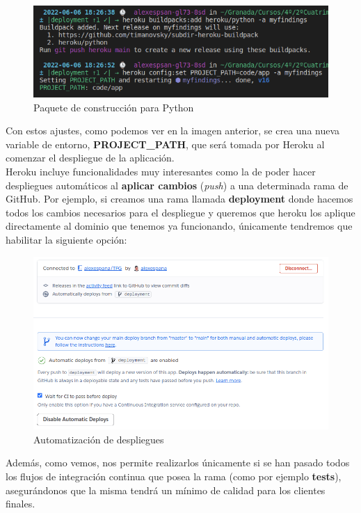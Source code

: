     \begin{figure}[H]
        \centering
        \includegraphics[scale=0.55]{imagenes/second-buildpack.png}
        \caption{Paquete de construcción para Python}
        \label{fig:heroku-buildpack-python}
    \end{figure}

Con estos ajustes, como podemos ver en la imagen anterior, se crea una nueva variable de
entorno, \textbf{PROJECT\_PATH}, que será tomada por Heroku al comenzar el despliegue de
la aplicación.\\

Heroku incluye funcionalidades muy interesantes como la de poder hacer despliegues
automáticos al \textbf{aplicar cambios} (\textit{push}) a una determinada rama de GitHub.
Por ejemplo, si creamos una rama llamada \textbf{deployment} donde hacemos todos los
cambios necesarios para el despliegue y queremos que heroku los aplique directamente al
dominio que tenemos ya funcionando, únicamente tendremos que habilitar la siguiente opción:

    \begin{figure}[H]
        \centering
        \includegraphics[scale=0.44]{imagenes/autodeploy.png}
        \caption{Automatización de despliegues}
        \label{fig:autodeploy}
    \end{figure}

Además, como vemos, nos permite realizarlos únicamente si se han pasado todos los flujos
de integración continua que posea la rama (como por ejemplo \textbf{tests}), asegurándonos
que la misma tendrá un mínimo de calidad para los clientes finales.\\

